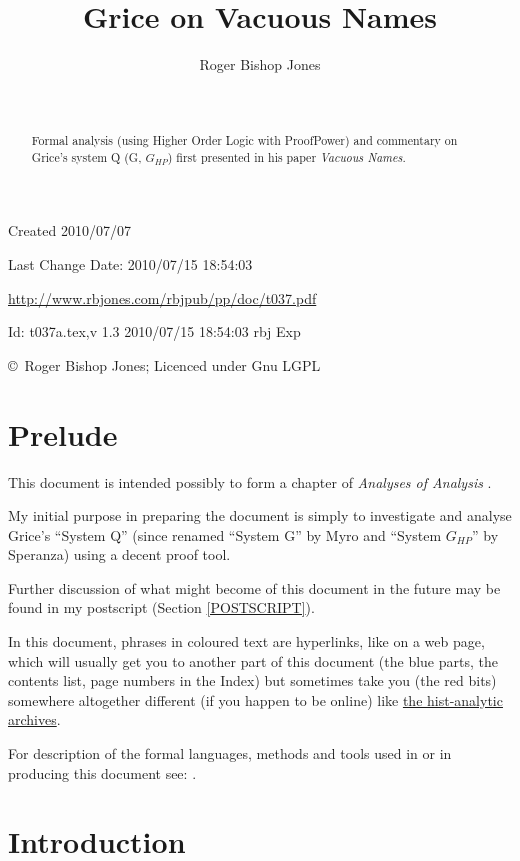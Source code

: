 \documentclass[11pt]{article}
\title{Grice on Vacuous Names}
\author{Roger Bishop Jones}
\date{\ }
\begin{document}
\begin{titlepage}
\maketitle
\begin{abstract}
Formal analysis (using Higher Order Logic with ProofPower) and commentary on Grice's system Q (G, $G_{HP}$) first presented in his paper \emph{Vacuous Names}.
\end{abstract}
\vfill

\begin{centering}
{\footnotesize

Created 2010/07/07

Last Change $ $Date: 2010/07/15 18:54:03 $ $

\href{http://www.rbjones.com/rbjpub/pp/doc/t037.pdf}
{http://www.rbjones.com/rbjpub/pp/doc/t037.pdf}

$ $Id: t037a.tex,v 1.3 2010/07/15 18:54:03 rbj Exp $ $

\copyright\ Roger Bishop Jones; Licenced under Gnu LGPL

}%
\end{centering}

\thispagestyle{empty}
\end{titlepage}

\newpage
\addtocounter{page}{1}
{\parskip=0pt\tableofcontents}

\section{Prelude}

This document is intended possibly to form a chapter of {\it Analyses of Analysis} \cite{rbjb003}.

My initial purpose in preparing the document is simply to investigate and analyse Grice's ``System Q'' (since renamed ``System G'' by Myro and ``System $G_{HP}$'' by Speranza) using a decent proof tool.

Further discussion of what might become of this document in the future may be found in my postscript (Section \ref{POSTSCRIPT}).

In this document, phrases in coloured text are hyperlinks, like on a web page, which will usually get you to another part of this document (the blue parts, the contents list, page numbers in the Index) but sometimes take you (the red bits) somewhere altogether different (if you happen to be online) like \href{http://rbjones.com/pipermail/hist-analytic_rbjones.com}{the hist-analytic archives}.

For description of the formal languages, methods and tools used in or in producing this document see: \cite{rbjt029}.

\section{Introduction}
\end{document}
